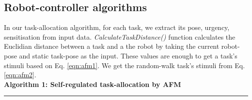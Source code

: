\documentclass[journal]{IEEEtran}
\newcommand{\HRule}{\rule{\linewidth}{0.3mm}}
\begin{document}
\subsection{Robot-controller algorithms}
\label{ss:rcc-alg}
In our task-allocation algorithm, for each task, we extract its pose, urgency, sensitisation from input data. \textit{CalculateTaskDistance()} function calculates the Euclidian distance between a task and a the robot by taking the current robot-pose and static task-pose as the input. These values are enough to get a task's stimuli based on Eq. \ref{eqn:afm1}. We get the random-walk task's stimuli from Eq. \ref{eqn:afm2}.\\

\textbf{Algorithm 1: Self-regulated task-allocation by AFM}
\vspace{-3mm}
\newline
\HRule
\end{document}
